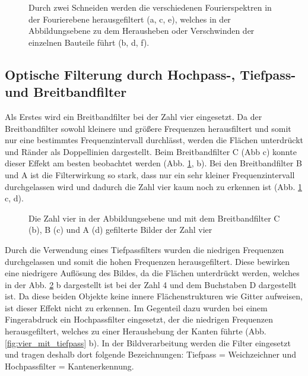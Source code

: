 \begin{figure}[h]
	\centering
	\caption[Abbildung Fourierhaus mit Filtern]{
		Durch zwei Schneiden werden die verschiedenen Fourierspektren in der Fourierebene herausgefiltert (a, c, e), welches in der   Abbildungsebene zu dem Herausheben oder Verschwinden der einzelnen Bauteile führt (b, d, f).
	}
	\label{fig:fourierhaus_mit_filtern}
\end{figure}

\subsection{Optische Filterung durch Hochpass-, Tiefpass- und Breitbandfilter}

Als Erstes wird ein Breitbandfilter bei der Zahl vier eingesetzt. Da der Breitbandfilter sowohl kleinere und größere Frequenzen herausfiltert und somit nur eine bestimmtes Frequenzintervall durchlässt, werden die Flächen unterdrückt und Ränder als Doppellinien dargestellt. Beim Breitbandfilter C (Abb %
c) konnte dieser Effekt am besten beobachtet werden (Abb. \ref{fig:fourierhaus_mit_filtern}, b). Bei den Breitbandfilter B und A ist die Filterwirkung so stark, dass nur
ein sehr kleiner Frequenzintervall durchgelassen wird und dadurch die Zahl vier kaum noch zu erkennen ist (Abb. \ref{fig:fourierhaus_mit_filtern} c, d).

\begin{figure}[h]
	\centering
	\caption[Zahl 4 mit Breitbandfiltern]{Die Zahl vier in  der Abbildungsebene und mit dem Breitbandfilter C (b), B (c) 
	und A (d) gefilterte Bilder der Zahl vier}
	\label{fig:vier_mit_breitband}
\end{figure}

Durch die Verwendung eines Tiefpassfilters wurden die niedrigen Frequenzen durchgelassen und somit die hohen Frequenzen herausgefiltert. Diese bewirken eine niedrigere Auflösung des
Bildes, da die Flächen unterdrückt werden, welches in der Abb. \ref{fig:vier_mit_breitband} b dargestellt ist bei der Zahl 4 und dem Buchstaben D dargestellt ist. Da diese beiden Objekte keine innere Flächenstrukturen wie Gitter aufweisen, ist dieser Effekt nicht zu erkennen.
Im Gegenteil dazu wurden bei einem Fingerabdruck ein Hochpassfilter eingesetzt, der die niedrigen Frequenzen herausgefiltert, welches zu einer Heraushebung der Kanten führte (Abb. \ref{fig:vier_mit_tiefpass} b). In der Bildverarbeitung werden die Filter eingesetzt und tragen deshalb dort folgende Bezeichnungen: Tiefpass = Weichzeichner und Hochpassfilter = Kantenerkennung.

